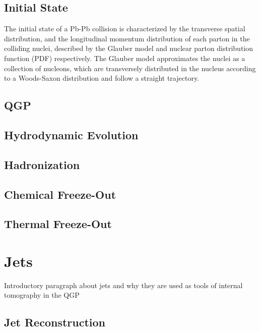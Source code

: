 \subsection*{Initial State}

The initial state of a Pb-Pb collision is characterized by the transverse spatial distribution, and the longitudinal momentum distribution of each parton in the colliding nuclei, described by the Glauber model and nuclear parton distribution function (PDF) respectively. The Glauber model approximates the nuclei as a collection of nucleons, which are transversely distributed in the nucleus according to a Woods-Saxon distribution and follow a straight trajectory. 

\subsection*{QGP}

\subsection*{Hydrodynamic Evolution}

\subsection*{Hadronization}

\subsection*{Chemical Freeze-Out}

\subsection*{Thermal Freeze-Out}

\section{Jets}

Introductory paragraph about jets and why they are used as tools of internal tomography in the QGP

\subsection*{Jet Reconstruction}

